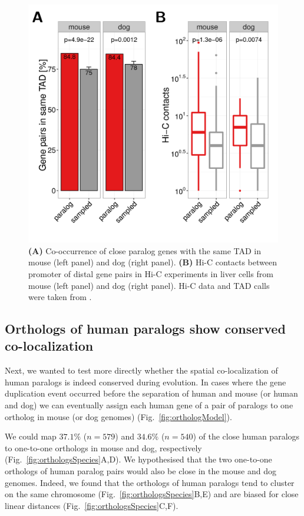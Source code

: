 \documentclass[a4paper,twoside=true,openright,parskip=full,chapterprefix=true,11pt,headings=normal,bibliography=totoc,listof=totoc,titlepage=on,captions=tableabove,draft=false]{scrreprt}
\theoremstyle{definition}
\theoremstyle{definition}
\theoremstyle{definition}
\theoremstyle{remark}
\begin{document}
\begin{figure}

{\centering \includegraphics[width=0.5\linewidth]{figures/paralog/fig5_09} 

}

\caption{\textbf{(A)} Co-occurrence of close paralog genes
with the same TAD in mouse (left panel) and dog (right panel).
\textbf{(B)} Hi-C contacts between promoter of distal gene pairs in Hi-C
experiments in liver cells from mouse (left panel) and dog (right
panel). Hi-C data and TAD calls were taken from \citep{VietriRudan2015}.}\label{fig:paralogsMouseDog}
\end{figure}







\subsection{Orthologs of human paralogs show conserved
co-localization}\label{orthologs-of-human-paralogs-show-conserved-co-localization}

Next, we wanted to test more directly whether the spatial
co-localization of human paralogs is indeed conserved during evolution.
In cases where the gene duplication event occurred before the separation
of human and mouse (or human and dog) we can eventually assign each
human gene of a pair of paralogs to one ortholog in mouse (or dog
genomes) (Fig.~\ref{fig:orthologModel}).

We could map \(37.1\%\) (\(n=579\)) and \(34.6\%\) (\(n=540\)) of the
close human paralogs to one-to-one orthologs in mouse and dog,
respectively (Fig.~\ref{fig:orthologsSpecies}A,D). We hypothesised that
the two one-to-one orthologs of human paralog pairs would also be close
in the mouse and dog genomes. Indeed, we found that the orthologs of
human paralogs tend to cluster on the same chromosome
(Fig.~\ref{fig:orthologsSpecies}B,E) and are biased for close linear
distances (Fig.~\ref{fig:orthologsSpecies}C,F).
\end{document}
